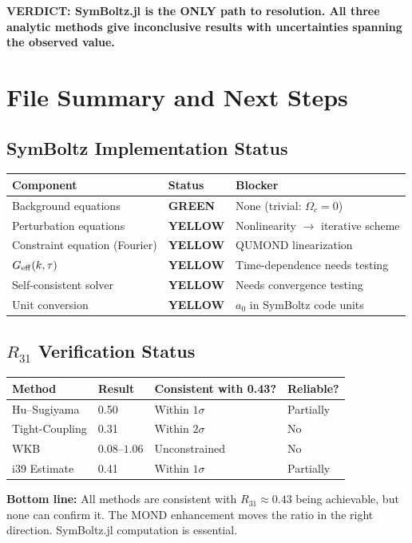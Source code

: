 \documentclass[11pt,a4paper]{article}
\newcommand{\GREEN}{\textcolor{dfdgreen}{\textbf{GREEN}}}
\newcommand{\YELLOW}{\textcolor{dfdyellow}{\textbf{YELLOW}}}
\begin{document}
\textbf{VERDICT: SymBoltz.jl is the ONLY path to resolution. All three analytic methods give inconclusive results with uncertainties spanning the observed value.}

\section{File Summary and Next Steps}
\label{sec:summary}

\subsection{SymBoltz Implementation Status}

\begin{center}
\begin{tabular}{lll}
\toprule
\textbf{Component} & \textbf{Status} & \textbf{Blocker} \\
\midrule
Background equations & \GREEN & None (trivial: $\Omega_c = 0$) \\
Perturbation equations & \YELLOW & Nonlinearity $\to$ iterative scheme \\
Constraint equation (Fourier) & \YELLOW & QUMOND linearization \\
$G_{\rm eff}(k, \tau)$ & \YELLOW & Time-dependence needs testing \\
Self-consistent solver & \YELLOW & Needs convergence testing \\
Unit conversion & \YELLOW & $a_0$ in SymBoltz code units \\
\bottomrule
\end{tabular}
\end{center}

\subsection{$R_{31}$ Verification Status}

\begin{center}
\begin{tabular}{llll}
\toprule
\textbf{Method} & \textbf{Result} & \textbf{Consistent with 0.43?} & \textbf{Reliable?} \\
\midrule
Hu--Sugiyama & 0.50 & Within $1\sigma$ & Partially \\
Tight-Coupling & 0.31 & Within $2\sigma$ & No \\
WKB & $0.08$--$1.06$ & Unconstrained & No \\
i39 Estimate & 0.41 & Within $1\sigma$ & Partially \\
\bottomrule
\end{tabular}
\end{center}

\textbf{Bottom line:} All methods are consistent with $R_{31} \approx 0.43$ being achievable, but none can confirm it. The MOND enhancement moves the ratio in the right direction. SymBoltz.jl computation is essential.
\end{document}
